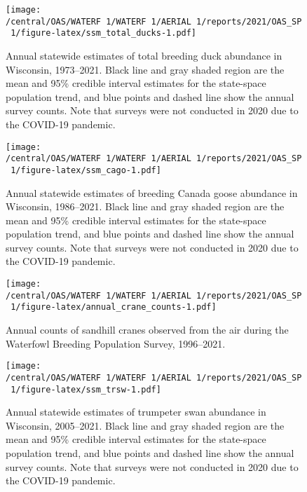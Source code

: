 \documentclass[
  12pt,
]{article}
\begin{document}
\newpage

\begin{figure}
\centering
\texttt{[image: /central/OAS/WATERF~1/WATERF~1/AERIAL~1/reports/2021/OAS\_SP~1/figure-latex/ssm\_total\_ducks-1.pdf]}
\caption{\label{fig:ssm_total_ducks}Annual statewide estimates of total
breeding duck abundance in Wisconsin, 1973--2021. Black line and gray
shaded region are the mean and 95\% credible interval estimates for the
state-space population trend, and blue points and dashed line show the
annual survey counts. Note that surveys were not conducted in 2020 due
to the COVID-19 pandemic.}
\end{figure}

\newpage

\begin{figure}
\centering
\texttt{[image: /central/OAS/WATERF~1/WATERF~1/AERIAL~1/reports/2021/OAS\_SP~1/figure-latex/ssm\_cago-1.pdf]}
\caption{\label{fig:ssm_cago}Annual statewide estimates of breeding
Canada goose abundance in Wisconsin, 1986--2021. Black line and gray
shaded region are the mean and 95\% credible interval estimates for the
state-space population trend, and blue points and dashed line show the
annual survey counts. Note that surveys were not conducted in 2020 due
to the COVID-19 pandemic.}
\end{figure}

\newpage

\begin{figure}
\centering
\texttt{[image: /central/OAS/WATERF~1/WATERF~1/AERIAL~1/reports/2021/OAS\_SP~1/figure-latex/annual\_crane\_counts-1.pdf]}
\caption{\label{fig:annual_crane_counts}Annual counts of sandhill cranes
observed from the air during the Waterfowl Breeding Population Survey,
1996--2021.}
\end{figure}

\newpage

\begin{figure}
\centering
\texttt{[image: /central/OAS/WATERF~1/WATERF~1/AERIAL~1/reports/2021/OAS\_SP~1/figure-latex/ssm\_trsw-1.pdf]}
\caption{\label{fig:ssm_trsw}Annual statewide estimates of trumpeter
swan abundance in Wisconsin, 2005--2021. Black line and gray shaded
region are the mean and 95\% credible interval estimates for the
state-space population trend, and blue points and dashed line show the
annual survey counts. Note that surveys were not conducted in 2020 due
to the COVID-19 pandemic.}
\end{figure}
\end{document}
